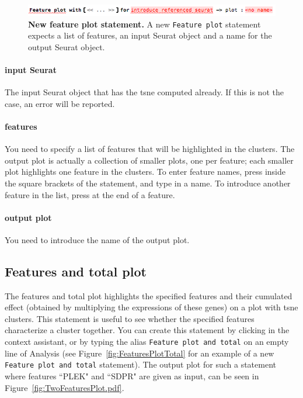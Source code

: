 \begin{figure}[h!tbp]
  \centering
  \includegraphics[width=\figWidthWide]{figures/FeaturesPlot.png}
    \caption[New feature plot statement.]{\textbf{New feature plot statement.} A new
    \texttt{Feature plot} statement expects a list of features, an input Seurat object
    and a name for the output Seurat object.}
\label{fig:FeaturesPlot}
\end{figure}

\paragraph{input Seurat} The input Seurat object that has the tsne computed already. If this
is not the case, an error will be reported.

\paragraph{features} You need to specify a list of features that will be highlighted in the
clusters. The output plot is actually a collection of smaller plots, one per feature; each
smaller plot highlights one feature in the clusters. To enter feature names, press \keys{\return}
inside the square brackets of the statement, and type in a name. To introduce another
feature in the list, press \keys{\return} at the end of a feature.

\paragraph{output plot} You need to introduce the name of the output plot.

\subsection{Features and total plot}
The features and total plot highlights the specified features and their cumulated effect
(obtained by multiplying the expressions of these genes) on a plot with tsne clusters. This statement
is useful to see whether the specified features characterize a cluster together.
You can create this statement by clicking
 in the context assistant, or by typing
the alias \texttt{Feature plot and total} on an empty line of Analysis (see Figure~\ref{fig:FeaturesPlotTotal}
for an example of a new \texttt{Feature plot and total} statement). The output plot
for such a statement where features ``PLEK" and ``SDPR" are given as input, can be seen in
Figure~\ref{fig:TwoFeaturesPlot.pdf}.

